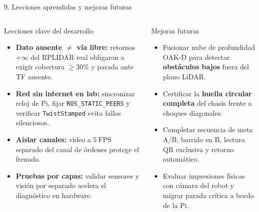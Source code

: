 \documentclass[aspectratio=169,10pt]{beamer}
\begin{document}
\begin{frame}{9. Lecciones aprendidas y mejoras futuras}
  \small
  \begin{columns}[T,onlytextwidth]
    \begin{block}{Lecciones clave del desarrollo}
      \begin{itemize}
        \item \textbf{Dato ausente $\neq$ vía libre:} retornos $+\infty$ del RPLIDAR real obligaron a exigir cobertura $\ge 30\%$ y parada ante TF ausente.
        \item \textbf{Red sin internet en lab:} sincronizar reloj de Pi, fijar \texttt{ROS\_STATIC\_PEERS} y verificar \texttt{TwistStamped} evita fallos silenciosos.
        \item \textbf{Aislar canales:} video a $5\ \mathrm{FPS}$ separado del canal de órdenes protege el frenado.
        \item \textbf{Pruebas por capas:} validar sensores y visión por separado acelera el diagnóstico en hardware.
      \end{itemize}
    \end{block}

    \begin{block}{Mejoras futuras}
      \begin{itemize}
        \item Fusionar nube de profundidad OAK-D para detectar \textbf{obstáculos bajos} fuera del plano LiDAR.
        \item Certificar la \textbf{huella circular completa} del chasis frente a choques diagonales.
        \item Completar secuencia de meta A/B, barrido en B, lectura QR exclusiva y retorno automático.
        \item Evaluar impresiones físicas con cámara del robot y migrar parada crítica a bordo de la Pi.
      \end{itemize}
    \end{block}
  \end{columns}
\end{frame}
\end{document}
